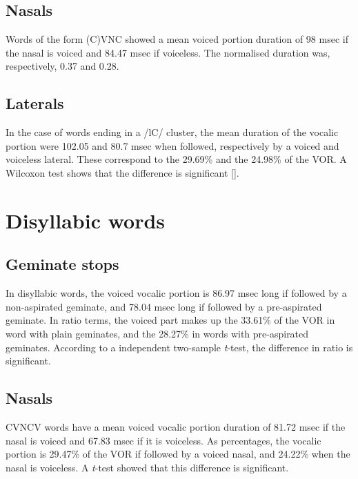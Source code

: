 \documentclass[11pt,a4paper,openany]{memoir}\usepackage[]{graphicx}\usepackage[]{color}
\begin{document}
\subsection{Nasals}



Words of the form (C)VNC showed a mean voiced portion duration of 98 msec if the nasal is voiced and 84.47 msec if voiceless.
The normalised duration was, respectively, 0.37 and 0.28.

\subsection{Laterals}



In the case of words ending in a /lC/ cluster, the mean duration of the vocalic portion were 102.05 and 80.7 msec when followed, respectively by a voiced and voiceless lateral.
These correspond to the 29.69\% and the 24.98\% of the VOR.
A Wilcoxon test shows that the difference is significant [].

\section{Disyllabic words}

\subsection{Geminate stops}




In disyllabic words, the voiced vocalic portion is 86.97 msec long if followed by a non-aspirated geminate, and 78.04 msec long if followed by a pre-aspirated geminate.
In ratio terms, the voiced part makes up the 33.61\% of the VOR in word with plain geminates, and the 28.27\% in words with pre-aspirated geminates.
According to a independent two-sample \textit{t}-test, the difference in ratio is significant.

\subsection{Nasals}




CVNCV words have a mean voiced vocalic portion duration of 81.72 msec if the nasal is voiced and 67.83 msec if it is voiceless.
As percentages, the vocalic portion is 29.47\% of the VOR if followed by a voiced nasal, and 24.22\% when the nasal is voiceless.
A \textit{t}-test showed that this difference is significant.
\end{document}
